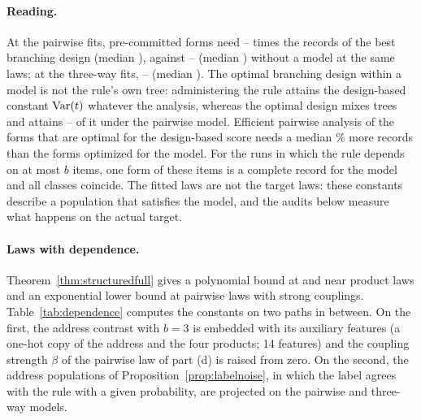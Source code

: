 \paragraph{Reading.}
At the pairwise fits, pre-committed forms need \nModelTwoLo--\nModelTwoHi{} times the records of the best branching design (median \nModelTwoMed), against \nModelDesignLo--\nModelDesignHi{} (median \nModelDesignMed) without a model at the same laws; at the three-way fits, \nModelThreeLo--\nModelThreeHi{} (median \nModelThreeMed). The optimal branching design within a model is not the rule's own tree: administering the rule attains the design-based constant $\operatorname{Var}(t)$ whatever the analysis, whereas the optimal design mixes trees and attains \nModelTwoBrLo--\nModelTwoBrHi{} of it under the pairwise model. Efficient pairwise analysis of the forms that are optimal for the design-based score needs a median \nModelTwoDesForms\% more records than the forms optimized for the model. For the runs in which the rule depends on at most $b$ items, one form of these items is a complete record for the model and all classes coincide. The fitted laws are not the target laws: these constants describe a population that satisfies the model, and the audits below measure what happens on the actual target.

\paragraph{Laws with dependence.}
Theorem~\ref{thm:structuredfull} gives a polynomial bound at and near product laws and an exponential lower bound at pairwise laws with strong couplings. Table~\ref{tab:dependence} computes the constants on two paths in between. On the first, the address contrast with $b=3$ is embedded with its auxiliary features (a one-hot copy of the address and the four products; 14 features) and the coupling strength $\beta$ of the pairwise law of part (d) is raised from zero. On the second, the address populations of Proposition~\ref{prop:labelnoise}, in which the label agrees with the rule with a given probability, are projected on the pairwise and three-way models.

\nDependenceAppendixText

